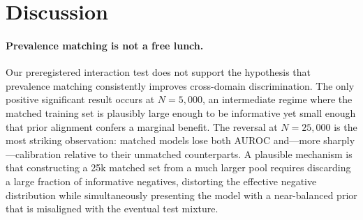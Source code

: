 \documentclass[11pt]{article}
\begin{document}
\section{Discussion}

\paragraph{Prevalence matching is not a free lunch.} Our preregistered interaction test does not support the hypothesis that prevalence matching consistently improves cross-domain discrimination. The only positive significant result occurs at $N=5{,}000$, an intermediate regime where the matched training set is plausibly large enough to be informative yet small enough that prior alignment confers a marginal benefit. The reversal at $N=25{,}000$ is the most striking observation: matched models lose both AUROC and---more sharply---calibration relative to their unmatched counterparts. A plausible mechanism is that constructing a 25k matched set from a much larger pool requires discarding a large fraction of informative negatives, distorting the effective negative distribution while simultaneously presenting the model with a near-balanced prior that is misaligned with the eventual test mixture.
\end{document}
